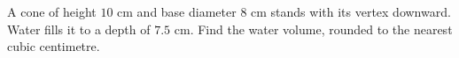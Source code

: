 A cone of height $10$ cm and base diameter $8$ cm stands with its vertex downward. Water fills it to a depth of $7.5$ cm. Find the water volume, rounded to the nearest cubic centimetre.
